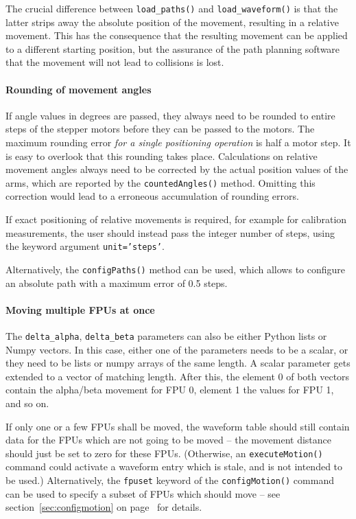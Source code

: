 \documentclass[11pt,a4paper]{scrartcl}
\begin{document}
The crucial difference between \texttt{load\_paths()} and
\texttt{load\_waveform()} is that the latter strips away the absolute
position of the movement, resulting in a relative movement.  This has
the consequence that the resulting movement can be applied to a
different starting position, but the assurance of the path planning
software that the movement will not lead to collisions is lost.


\paragraph{Rounding of movement angles}
%
%
If angle values in degrees are passed, they always need to be rounded
to entire steps of the stepper motors before they can be passed to the
motors.  The maximum rounding error \emph{for a single positioning
  operation} is half a motor step.  It is easy to overlook that this
rounding takes place.  Calculations on relative movement angles always
need to be corrected by the actual position values of the arms, which
are reported by the \texttt{countedAngles()} method. Omitting this
correction would lead to a erroneous accumulation of rounding errors.

If exact positioning of relative movements is required, for example
for calibration measurements, the user should instead pass the integer
number of steps, using the keyword argument \texttt{unit='steps'}.

Alternatively, the \texttt{configPaths()} method can be used, which
allows to configure an absolute path with a maximum error of 0.5
steps.

\paragraph{Moving multiple FPUs at once}
 The
\verb+delta_alpha+, \verb+delta_beta+ parameters can also be either
Python lists or Numpy vectors. In this case, either one of the
parameters needs to be a scalar, or they need to be lists or numpy
arrays of the same length. A scalar parameter gets extended to a
vector of matching length. After this, the element 0 of both vectors
contain the alpha/beta movement for FPU 0, element 1 the values for
FPU 1, and so on.

If only one or a few FPUs shall be moved, the waveform table should
still contain data for the FPUs which are not going to be moved -- the
movement distance should just be set to zero for these FPUs.
(Otherwise, an \texttt{executeMotion()} command could activate a
waveform entry which is stale, and is not intended to be used.)
Alternatively, the \texttt{fpuset} keyword of the
\texttt{configMotion()} command can be used to specify a subset of FPUs
which should move -- see section~\ref{sec:configmotion} on
page~\pageref{sec:configmotion} for details.
\end{document}

